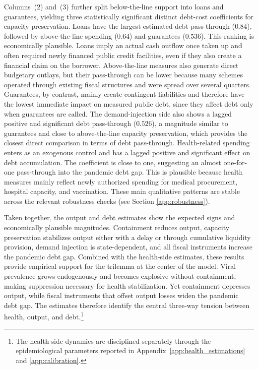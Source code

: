 \documentclass[12pt, a4paper]{article}
\begin{document}
Columns~(2) and~(3) further split below-the-line support into loans and guarantees, yielding three statistically significant distinct debt-cost coefficients for capacity preservation. Loans have the largest estimated debt pass-through ($0.84$), followed by above-the-line spending ($0.64$) and guarantees ($0.536$). This ranking is economically plausible. Loans imply an actual cash outflow once taken up and often required newly financed public credit facilities, even if they also create a financial claim on the borrower. Above-the-line measures also generate direct budgetary outlays, but their pass-through can be lower because many schemes operated through existing fiscal structures and were spread over several quarters. Guarantees, by contrast, mainly create contingent liabilities and therefore have the lowest immediate impact on measured public debt, since they affect debt only when guarantees are called. The demand-injection side also shows a lagged positive and significant debt pass-through ($0.526$), a magnitude similar to guarantees and close to above-the-line capacity preservation, which provides the closest direct comparison in terms of debt pass-through. Health-related spending enters as an exogenous control and has a lagged positive and significant effect on debt accumulation. The coefficient is close to one, suggesting an almost one-for-one pass-through into the pandemic debt gap. This is plausible because health measures mainly reflect newly authorized spending for medical procurement, hospital capacity, and vaccination. These main qualitative patterns are stable across the relevant robustness checks (see Section \ref{app:robustness}).

Taken together, the output and debt estimates show the expected signs and economically plausible magnitudes. Containment reduces output, capacity preservation stabilizes output either with a delay or through cumulative liquidity provision, demand injection is state-dependent, and all fiscal instruments increase the pandemic debt gap. Combined with the health-side estimates, these results provide empirical support for the trilemma at the center of the model. Viral prevalence grows endogenously and becomes explosive without containment, making suppression necessary for health stabilization. Yet containment depresses output, while fiscal instruments that offset output losses widen the pandemic debt gap. The estimates therefore identify the central three-way tension between health, output, and debt.\footnote{The health-side dynamics are disciplined separately through the epidemiological parameters reported in Appendix~\ref{app:health_estimations} and \ref{app:calibration}.}
\end{document}
